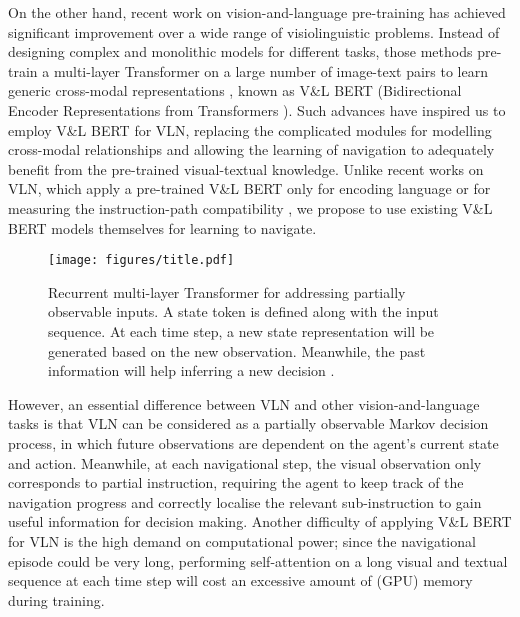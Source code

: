 \documentclass[final]{cvpr}
\begin{document}
On the other hand, recent work on vision-and-language pre-training has achieved significant improvement over a wide range of visiolinguistic problems. Instead of designing complex and monolithic models for different tasks, those methods pre-train a multi-layer Transformer \cite{vaswani2017attention} on a large number of image-text pairs to learn generic cross-modal representations \cite{chen2020uniter,li2020unicoder,li2019visualbert,li2020oscar, lu2019vilbert,su2019vl,tan2019lxmert}, known as V\&L BERT (Bidirectional Encoder Representations from Transformers \cite{devlin2019bert}). Such advances have inspired us to employ V\&L BERT for VLN, replacing the complicated modules for modelling cross-modal relationships and allowing the learning of navigation to adequately benefit from the pre-trained visual-textual knowledge. Unlike recent works on VLN, which apply a pre-trained V\&L BERT only for encoding language \cite{hao2020towards,li2019robust} or for measuring the instruction-path compatibility \cite{majumdar2020improving}, we propose to use existing V\&L BERT models themselves for learning to navigate.

\begin{figure}[t]
  \centering
  \texttt{[image: figures/title.pdf]}
  \caption{Recurrent multi-layer Transformer for addressing partially observable inputs. A state token is defined along with the input sequence. At each time step, a new state representation  will be generated based on the new observation. Meanwhile, the past information will help inferring a new decision .}
  \label{fig:title}
  \vspace{-1em}
\end{figure}

However, an essential difference between VLN and other vision-and-language tasks is that VLN can be considered as a partially observable Markov decision process, in which future observations are dependent on the agent's current state and action. Meanwhile, at each navigational step, the visual observation only corresponds to partial instruction, requiring the agent to keep track of the navigation progress and correctly localise the relevant sub-instruction to gain useful information for decision making. Another difficulty of applying V\&L BERT for VLN is the high demand on computational power; since the navigational episode could be very long, performing self-attention on a long visual and textual sequence at each time step will cost an excessive amount of (GPU) memory during training.
\end{document}
